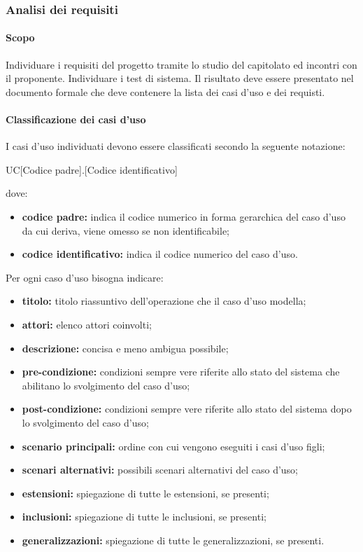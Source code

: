         \subsubsection{Analisi dei requisiti}
            \paragraph{Scopo}
            Individuare i requisiti del progetto tramite lo studio del capitolato ed incontri con il proponente. Individuare i test di sistema. Il risultato deve essere presentato nel documento formale \adr{} che deve contenere la lista dei casi d'uso e dei requisti.
            \paragraph{Classificazione dei casi d'uso}
            I casi d'uso individuati devono essere classificati secondo la seguente notazione:
            \begin{center}
            UC[Codice padre].[Codice identificativo]
            \end{center}
            dove:
            \begin{itemize}
                \item \textbf{codice padre:} indica il codice numerico in forma gerarchica del caso d'uso da cui deriva, viene omesso se non identificabile;
                \item \textbf{codice identificativo:} indica il codice numerico del caso d'uso.
            \end{itemize}
            Per ogni caso d'uso bisogna indicare:
            \begin{itemize}
                \item \textbf{titolo:} titolo riassuntivo dell'operazione che il caso d'uso modella;
                \item \textbf{attori:} elenco attori coinvolti;
                \item \textbf{descrizione:} concisa e meno ambigua possibile;
                \item \textbf{pre-condizione:} condizioni sempre vere riferite allo stato del sistema che abilitano lo svolgimento del caso d'uso;
                \item \textbf{post-condizione:} condizioni sempre vere riferite allo stato del sistema dopo lo svolgimento del caso d'uso;
                \item \textbf{scenario principali:} ordine con cui vengono eseguiti i casi d'uso figli;
                \item \textbf{scenari alternativi:} possibili scenari alternativi del caso d'uso;
                \item \textbf{estensioni:} spiegazione di tutte le estensioni, se presenti;
                \item \textbf{inclusioni:} spiegazione di tutte le inclusioni, se presenti;
                \item \textbf{generalizzazioni:} spiegazione di tutte le generalizzazioni, se presenti.
            \end{itemize}

